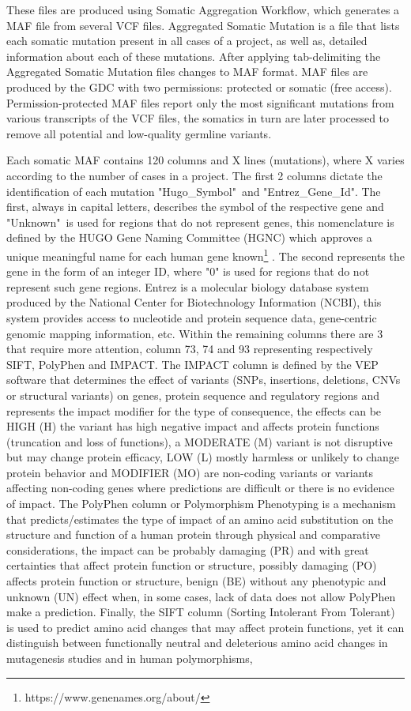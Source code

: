 These files are produced using Somatic Aggregation Workflow, which generates a MAF file from several VCF files. Aggregated Somatic Mutation is a file that lists each somatic mutation present in all cases of a project, as well as, detailed information about each of these mutations. After applying tab-delimiting the Aggregated Somatic Mutation files changes to MAF format. MAF files are produced by the GDC with two permissions: protected or somatic (free access). Permission-protected MAF files report only the most significant mutations from various transcripts of the VCF files, the somatics in turn are later processed to remove all potential and low-quality germline variants. 

Each somatic MAF contains 120 columns and X lines (mutations), where X varies according to the number of cases in a project. The first 2 columns dictate the identification of each mutation "Hugo\_Symbol"\ and "Entrez\_Gene\_Id". The first, always in capital letters, describes the  symbol of the respective gene and "Unknown"\ is used for regions that do not represent genes, this nomenclature is defined by the HUGO Gene Naming Committee (HGNC) which approves a unique meaningful name for each human gene known\footnote{https://www.genenames.org/about/} \cite{Bruford}. The second represents the gene in the form of an integer ID, where "0" is used for regions that do not represent such gene regions. Entrez is a molecular biology database system produced by the National Center for Biotechnology Information (NCBI), this system provides access to nucleotide and protein sequence data, gene-centric genomic mapping information, etc. Within the remaining columns there are 3 that require more attention, column 73, 74 and 93 representing respectively SIFT, PolyPhen and IMPACT. The IMPACT column is defined by the VEP software that determines the effect of variants (SNPs, insertions, deletions, CNVs or structural variants) on genes, protein sequence and regulatory regions and represents the impact modifier for the type of consequence, the effects can be HIGH (H) the variant has high negative impact and affects protein functions (truncation and loss of functions), a MODERATE (M) variant is not disruptive but may change protein efficacy, LOW (L) mostly harmless or unlikely to change protein behavior and MODIFIER (MO) are non-coding variants or variants affecting non-coding genes where predictions are difficult or there is no evidence of impact. The PolyPhen column or Polymorphism Phenotyping is a mechanism that predicts/estimates the type of impact of an amino acid substitution on the structure and function of a human protein through physical and comparative considerations, the impact can be probably damaging (PR) and with great certainties that affect protein function or structure, possibly damaging (PO) affects protein function or structure, benign (BE) without any phenotypic and unknown (UN) effect when, in some cases, lack of data does not allow PolyPhen make a prediction. Finally, the SIFT column (Sorting Intolerant From Tolerant) is used to predict amino acid changes that may affect protein functions, yet it can distinguish between functionally neutral and deleterious amino acid changes in mutagenesis studies and in human polymorphisms, 